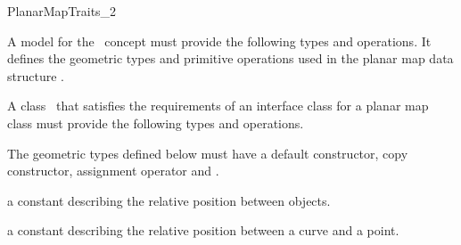 
\ccRefPageBegin


\begin{ccRefConcept}{PlanarMapTraits_2}
\label{PM_sec:req:interface} 
 
   
   A model for the \ccRefName\ concept must provide the following types and
   operations. It defines the geometric types and primitive operations used
   in the planar map data structure .



\ccDefinition
    A class \ccClassTemplateName\ that satisfies the requirements of an
    interface class for a planar map class must provide the following types
    and operations. 

\ccTypes

    The geometric types defined below must have a default constructor,
    copy constructor, assignment operator and .
    
    

    


    {a constant describing the relative position between objects.}
    
    {a constant describing the relative position between a curve and a point.}


\end{ccRefConcept}
